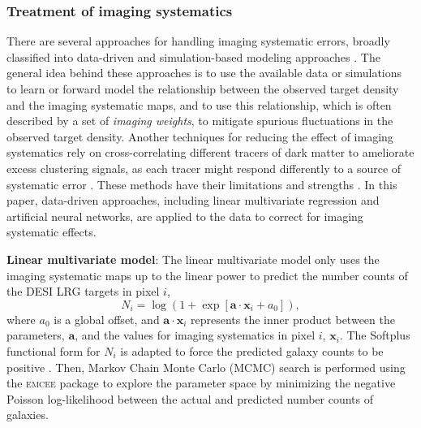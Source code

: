 \subsubsection{Treatment of imaging systematics}
There are several approaches for handling imaging systematic errors, broadly classified into data-driven and simulation-based modeling approaches \citep[see e.g.][]{ross2011, ashley2012MNRAS,Ross17,2012ApJ...761...14H,suchyta2016,delubac2016sdss, prakash2016sdss, Raichoor2017MNRAS.471.3955R, laurent2017clustering, Elvin18, 2018ApJ...863..110B, 2020MNRAS.495.1613R, kong2020,rezaie2021primordial,Everett_2022, chaussidon2022angular,Eggert_2023}. The general idea behind these approaches is to use the available data or simulations to learn or forward model the relationship between the observed target density and the imaging systematic maps, and to use this relationship, which is often described by a set of \textit{imaging weights}, to mitigate spurious fluctuations in the observed target density. Another techniques for reducing the effect of imaging systematics rely on cross-correlating different tracers of dark matter to ameliorate excess clustering signals, as each tracer might respond differently to a source of systematic error \citep[see, e.g.,][]{giannantonio2014improved}. These methods have their limitations and strengths \citep[see, e.g.,][for a review]{2021MNRAS.503.5061W}. In this paper, data-driven approaches, including linear multivariate regression and artificial neural networks, are applied to the data to correct for imaging systematic effects.

\textbf{Linear multivariate model}: The linear multivariate model only uses the imaging systematic maps up to the linear power to predict the number counts of the DESI LRG targets in pixel $i$,
\begin{equation}\label{eq:npred}
    N_{i} = \log ( 1 + \exp[\textbf{a}\cdot\textbf{x}_{i}+a_{0}]),
\end{equation}
where $a_{0}$ is a global offset, and $\textbf{a}\cdot\textbf{x}_{i}$ represents the inner product between the parameters, $\textbf{a}$, and the values for imaging systematics in pixel $i$, $\textbf{x}_{i}$. The Softplus functional form for $N_{i}$ is adapted to force the predicted galaxy counts to be positive \citep{dugas2001incorporating}. Then, Markov Chain Monte Carlo (MCMC) search is performed using the \textsc{emcee} package \citep{2013PASP..125..306F} to explore the parameter space by minimizing the negative Poisson log-likelihood between the actual and predicted number counts of galaxies.

